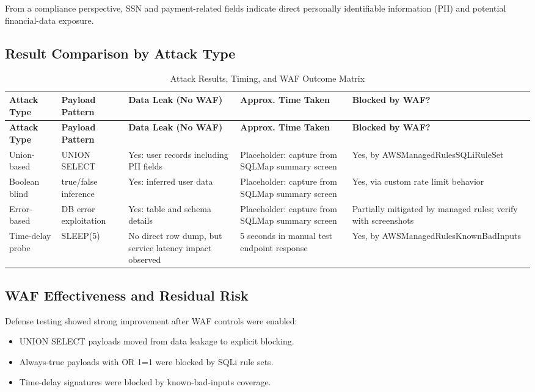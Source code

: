 \documentclass[12pt,a4paper]{article}
\begin{document}
From a compliance perspective, SSN and payment-related fields indicate direct personally identifiable information (PII) and potential financial-data exposure.

\subsection{Result Comparison by Attack Type}
\begin{longtable}{p{} p{} p{} p{} p{}}
\caption{Attack Results, Timing, and WAF Outcome Matrix}\\
\toprule
\textbf{Attack Type} & \textbf{Payload Pattern} & \textbf{Data Leak (No WAF)} & \textbf{Approx. Time Taken} & \textbf{Blocked by WAF?} \\
\midrule
\endfirsthead
\toprule
\textbf{Attack Type} & \textbf{Payload Pattern} & \textbf{Data Leak (No WAF)} & \textbf{Approx. Time Taken} & \textbf{Blocked by WAF?} \\
\midrule
\endhead
Union-based & UNION SELECT & Yes: user records including PII fields & Placeholder: capture from SQLMap summary screen & Yes, by AWSManagedRulesSQLiRuleSet \\
Boolean blind & true/false inference & Yes: inferred user data & Placeholder: capture from SQLMap summary screen & Yes, via custom rate limit behavior \\
Error-based & DB error exploitation & Yes: table and schema details & Placeholder: capture from SQLMap summary screen & Partially mitigated by managed rules; verify with screenshots \\
Time-delay probe & SLEEP(5) & No direct row dump, but service latency impact observed & 5 seconds in manual test endpoint response & Yes, by AWSManagedRulesKnownBadInputs \\
\bottomrule
\end{longtable}

\subsection{WAF Effectiveness and Residual Risk}
Defense testing showed strong improvement after WAF controls were enabled:
\begin{itemize}
  \item UNION SELECT payloads moved from data leakage to explicit blocking.
  \item Always-true payloads with OR 1=1 were blocked by SQLi rule sets.
  \item Time-delay signatures were blocked by known-bad-inputs coverage.
\end{itemize}
\end{document}
